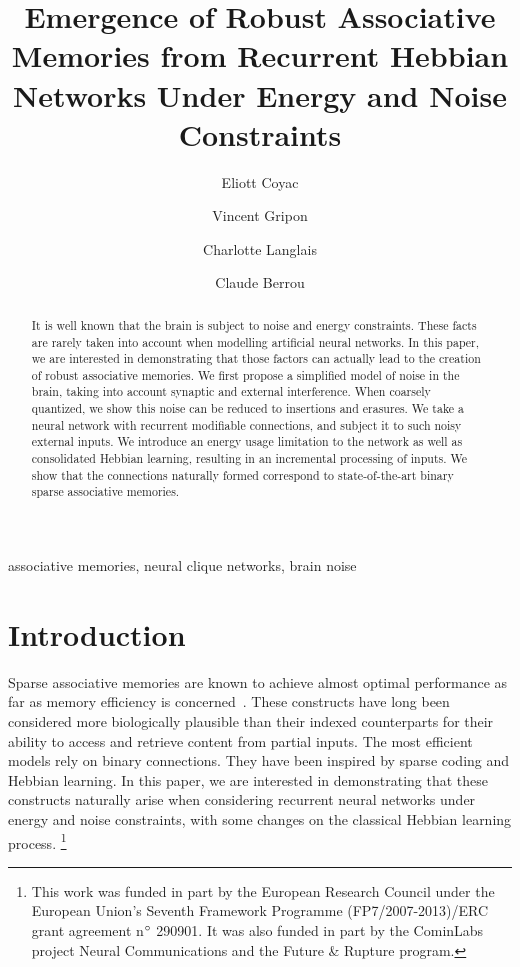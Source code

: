 \documentclass[journal]{IEEEtran}
\newcommand\blfootnote[1]{%
  \begingroup
  \renewcommand\thefootnote{}\footnote{#1}%
  \addtocounter{footnote}{-1}%
  \endgroup
}
\begin{document}
\author{Eliott Coyac}
\author{Vincent Gripon}
\author{Charlotte Langlais}
\author{Claude Berrou}


\title{Emergence of Robust Associative Memories from Recurrent Hebbian Networks Under Energy and Noise Constraints}

\maketitle

\begin{abstract}

  It is well known that the brain is subject to noise and energy constraints. These facts are rarely taken into account when modelling artificial neural networks. In this paper, we are interested in demonstrating that those factors can actually lead to the creation of robust associative memories. We first propose a simplified model of noise in the brain, taking into account synaptic and external interference. When coarsely quantized, we show this noise can be reduced to insertions and erasures. %
We take a neural network with recurrent modifiable connections, and subject it to such noisy external inputs. We introduce an energy usage limitation to the network as well as consolidated Hebbian learning, resulting in an incremental processing of inputs. We show that the connections naturally formed correspond to state-of-the-art binary sparse associative memories.

\end{abstract}

\begin{IEEEkeywords}
  associative memories, neural clique networks, brain noise
\end{IEEEkeywords}

\section{Introduction}

Sparse associative memories are known to achieve almost optimal performance as far as memory efficiency is concerned~\cite{gripon2015comparative}. These constructs have long been considered more biologically plausible than their indexed counterparts for their ability to access and retrieve content from partial inputs. The most efficient models rely on binary connections. They have been inspired by sparse coding and Hebbian learning. In this paper, we are interested in demonstrating that these constructs naturally arise when considering recurrent neural networks under energy and noise constraints, with some changes on the classical Hebbian learning process.
\blfootnote{This work was funded in part by the European Research Council under the European Union's Seventh Framework Programme (FP7/2007-2013)/ERC grant agreement n$\degree$ 290901. It was also funded in part by the CominLabs project Neural Communications and the Future \& Rupture program.}
\end{document}
